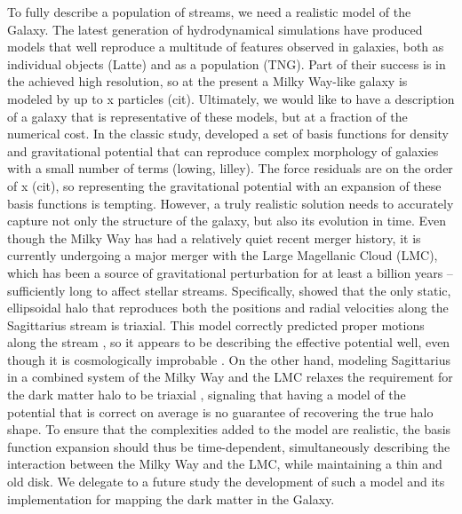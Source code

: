 \documentclass[modern]{aastex61}
\begin{document}
To fully describe a population of streams, we need a realistic model of the Galaxy.
The latest generation of hydrodynamical simulations have produced models that well reproduce a multitude of features observed in galaxies, both as individual objects (Latte) and as a population (TNG).
Part of their success is in the achieved high resolution, so at the present a Milky Way-like galaxy is modeled by up to x particles (cit).
Ultimately, we would like to have a description of a galaxy that is representative of these models, but at a fraction of the numerical cost.
In the classic study, \citet{ho} developed a set of basis functions for density and gravitational potential that can reproduce complex morphology of galaxies with a small number of terms (lowing, lilley).
The force residuals are on the order of x (cit), so representing the gravitational potential with an expansion of these basis functions is tempting.
However, a truly realistic solution needs to accurately capture not only the structure of the galaxy, but also its evolution in time.
Even though the Milky Way has had a relatively quiet recent merger history, it is currently undergoing a major merger with the Large Magellanic Cloud (LMC), which has been a source of gravitational perturbation for at least a billion years -- sufficiently long to affect stellar streams.
Specifically, \citet{lm10} showed that the only static, ellipsoidal halo that reproduces both the positions and radial velocities along the Sagittarius stream is triaxial.
This model correctly predicted proper motions along the stream \citep{sohn2015}, so it appears to be describing the effective potential well, even though it is cosmologically improbable \citep{debattista2013}.
On the other hand, modeling Sagittarius in a combined system of the Milky Way and the LMC relaxes the requirement for the dark matter halo to be triaxial \citep{vch2013}, signaling that having a model of the potential that is correct on average is no guarantee of recovering the true halo shape.
To ensure that the complexities added to the model are realistic, the basis function expansion should thus be time-dependent, simultaneously describing the interaction between the Milky Way and the LMC, while maintaining a thin and old disk. 
We delegate to a future study the development of such a model and its implementation for mapping the dark matter in the Galaxy.

\end{document}
